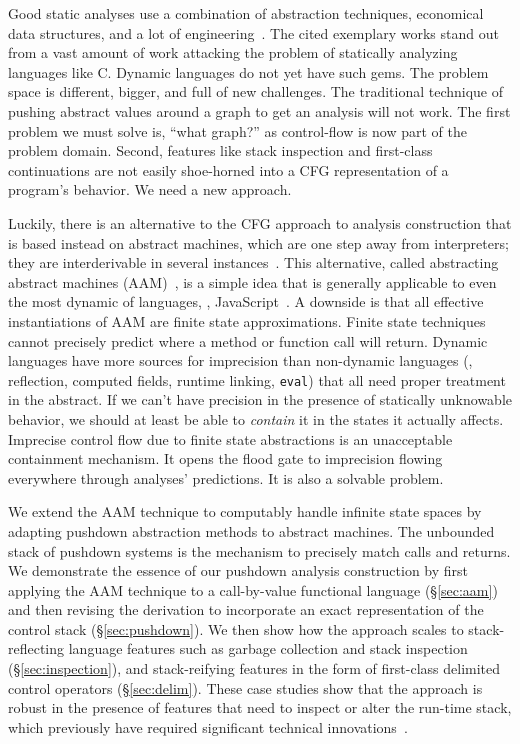 Good static analyses use a combination of abstraction techniques, economical data structures, and a lot of engineering~\citep{dvanhorn:CousotEtAl-TASE07,ianjohnson:DBLP:journals/ipl/YiCKK07}.
%
The cited exemplary works stand out from a vast amount of work attacking the problem of statically analyzing languages like C.
%
Dynamic languages do not yet have such gems.
%
The problem space is different, bigger, and full of new challenges.
%
The traditional technique of pushing abstract values around a graph to get an analysis will not work.
%
The first problem we must solve is, ``what graph?'' as control-flow is now part of the problem domain.
%
Second, features like stack inspection and first-class continuations are not easily shoe-horned into a CFG representation of a program's behavior.
%
We need a new approach. %

%
Luckily, there is an alternative to the CFG approach to analysis construction that is based instead on abstract machines, which are one step away from interpreters; they are interderivable in several instances~\citep{dvanhorn:Danvy:DSc}.
%
This alternative, called abstracting abstract machines
(AAM)~\citep{dvanhorn:VanHorn2012Systematic}, is a simple
idea that is generally applicable to even the most dynamic of
languages, \eg{},
JavaScript~\citep{ianjohnson:DBLP:journals/corr/KashyapDKWGSWH14}.
%
A downside is that all effective instantiations of AAM are finite state approximations.
%
Finite state techniques cannot precisely predict where a method or function call will return.
%
Dynamic languages have more sources for imprecision than non-dynamic languages (\eg{}, reflection, computed fields, runtime linking, {\tt eval}) that all need proper treatment in the abstract.
%
If we can't have precision in the presence of statically unknowable behavior, we should at least be able to \emph{contain} it in the states it actually affects.
%
Imprecise control flow due to finite state abstractions is an unacceptable containment mechanism.
%
It opens the flood gate to imprecision flowing everywhere through analyses' predictions.
%
It is also a solvable problem.
%

%
We extend the AAM technique to computably handle infinite state spaces by adapting pushdown abstraction methods to abstract machines.
%
The unbounded stack of pushdown systems is the mechanism to precisely match calls and returns.
%
We demonstrate the essence of our pushdown analysis construction by
first applying the AAM technique to a call-by-value functional
language (\S\ref{sec:aam}) and then revising the derivation to
incorporate an exact representation of the control stack
(\S\ref{sec:pushdown}).  We then show how the approach scales to
stack-reflecting language features such as garbage collection and
stack inspection (\S\ref{sec:inspection}), and stack-reifying features
in the form of first-class delimited control operators (\S\ref{sec:delim}).
%
These case studies show that the approach is robust in the presence of
features that need to inspect or alter the run-time stack, which
previously have required significant technical
innovations~\cite{dvanhorn:Vardoulakis2011Pushdown,ianjohnson:DBLP:journals/jfp/JohnsonSEMH14}.


